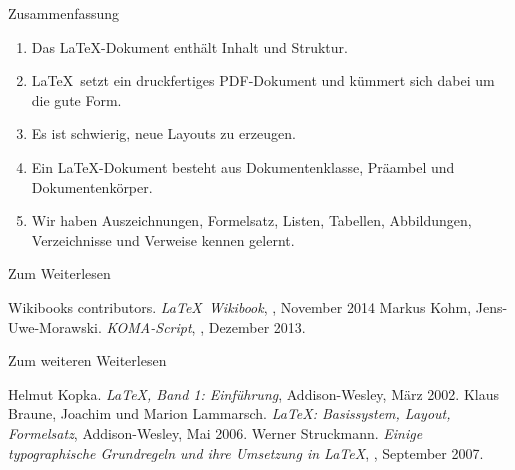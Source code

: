 \begin{frame}{Zusammenfassung}
  \begin{enumerate}
    \item Das \alert{\LaTeX-Dokument} enthält \alert{Inhalt und Struktur}.
    \item \LaTeX\ setzt ein druckfertiges \alert{PDF-Dokument} und kümmert sich dabei um die \alert{gute Form}.
    \item Es ist schwierig, \alert{neue Layouts} zu erzeugen.
    \item Ein \LaTeX-Dokument besteht aus \alert{Dokumentenklasse}, \alert{Präambel} und \alert{Dokumentenkörper}.
    \item Wir haben \alert{Auszeichnungen}, \alert{Formelsatz}, \alert{Listen}, \alert{Tabellen}, \alert{Abbildungen}, \alert{Verzeichnisse} und \alert{Verweise} kennen gelernt.
  \end{enumerate}
\end{frame}

\begin{Frame}[fragile]{Zum Weiterlesen}
  \begin{mybib}
      Wikibooks contributors.
      \newblock \emph{\LaTeX\ Wikibook},
      \newblock {}, November 2014
      Markus Kohm, Jens-Uwe-Morawski.
      \newblock \emph{KOMA-Script},
      \newblock {}, Dezember 2013.
  \end{mybib}
\end{Frame}

\begin{Frame}[fragile]{Zum weiteren Weiterlesen}
  \begin{mybib}
      Helmut Kopka.
      \newblock \emph{\LaTeX, Band 1: Einführung},
      \newblock Addison-Wesley, März 2002.
      Klaus Braune, Joachim und Marion Lammarsch.
      \newblock \emph{\LaTeX: Basissystem, Layout, Formelsatz},
      \newblock Addison-Wesley, Mai 2006.
      Werner Struckmann.
      \newblock \emph{Einige typographische Grundregeln und ihre Umsetzung in \LaTeX},
      \newblock {}, September 2007.
  \end{mybib}
\end{Frame}